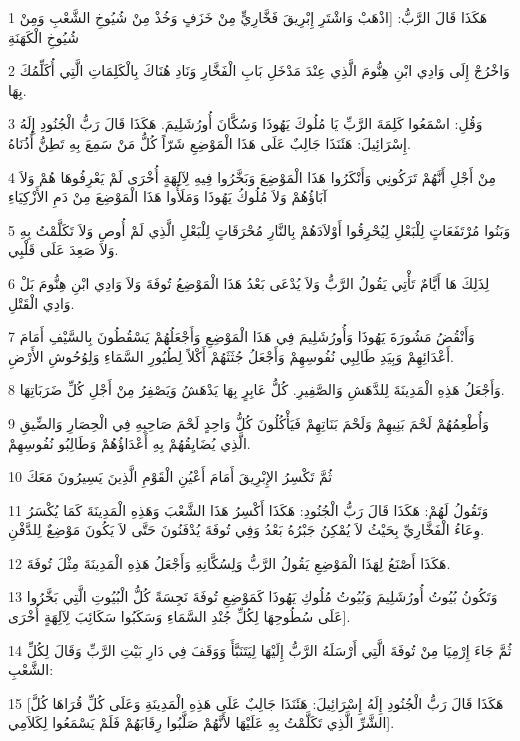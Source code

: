 \par 1 هَكَذَا قَالَ الرَّبُّ: [اذْهَبْ وَاشْتَرِ إِبْرِيقَ فَخَّارِيٍّ مِنْ خَزَفٍ وَخُذْ مِنْ شُيُوخِ الشَّعْبِ وَمِنْ شُيُوخِ الْكَهَنَةِ
\par 2 وَاخْرُجْ إِلَى وَادِي ابْنِ هِنُّومَ الَّذِي عِنْدَ مَدْخَلِ بَابِ الْفَخَّارِ وَنَادِ هُنَاكَ بِالْكَلِمَاتِ الَّتِي أُكَلِّمُكَ بِهَا.
\par 3 وَقُلِ: اسْمَعُوا كَلِمَةَ الرَّبِّ يَا مُلُوكَ يَهُوذَا وَسُكَّانَ أُورُشَلِيمَ. هَكَذَا قَالَ رَبُّ الْجُنُودِ إِلَهُ إِسْرَائِيلَ: هَئَنَذَا جَالِبٌ عَلَى هَذَا الْمَوْضِعِ شَرّاً كُلُّ مَنْ سَمِعَ بِهِ تَطِنُّ أُذُنَاهُ.
\par 4 مِنْ أَجْلِ أَنَّهُمْ تَرَكُونِي وَأَنْكَرُوا هَذَا الْمَوْضِعَ وَبَخَّرُوا فِيهِ لِآلِهَةٍ أُخْرَى لَمْ يَعْرِفُوهَا هُمْ وَلاَ آبَاؤُهُمْ وَلاَ مُلُوكُ يَهُوذَا وَمَلَأُوا هَذَا الْمَوْضِعَ مِنْ دَمِ الأَزْكِيَاءِ
\par 5 وَبَنُوا مُرْتَفَعَاتٍ لِلْبَعْلِ لِيُحْرِقُوا أَوْلاَدَهُمْ بِالنَّارِ مُحْرَقَاتٍ لِلْبَعْلِ الَّذِي لَمْ أُوصِ وَلاَ تَكَلَّمْتُ بِهِ وَلاَ صَعِدَ عَلَى قَلْبِي.
\par 6 لِذَلِكَ هَا أَيَّامٌ تَأْتِي يَقُولُ الرَّبُّ وَلاَ يُدْعَى بَعْدُ هَذَا الْمَوْضِعُ تُوفَةَ وَلاَ وَادِي ابْنِ هِنُّومَ بَلْ وَادِي الْقَتْلِ.
\par 7 وَأَنْقُضُ مَشُورَةَ يَهُوذَا وَأُورُشَلِيمَ فِي هَذَا الْمَوْضِعِ وَأَجْعَلُهُمْ يَسْقُطُونَ بِالسَّيْفِ أَمَامَ أَعْدَائِهِمْ وَبِيَدِ طَالِبِي نُفُوسِهِمْ وَأَجْعَلُ جُثَثَهُمْ أَكْلاً لِطُيُورِ السَّمَاءِ وَلِوُحُوشِ الأَرْضِ.
\par 8 وَأَجْعَلُ هَذِهِ الْمَدِينَةَ لِلدَّهَشِ وَالصَّفِيرِ. كُلُّ عَابِرٍ بِهَا يَدْهَشُ وَيَصْفِرُ مِنْ أَجْلِ كُلِّ ضَرَبَاتِهَا.
\par 9 وَأُطْعِمُهُمْ لَحْمَ بَنِيهِمْ وَلَحْمَ بَنَاتِهِمْ فَيَأْكُلُونَ كُلُّ وَاحِدٍ لَحْمَ صَاحِبِهِ فِي الْحِصَارِ وَالضِّيقِ الَّذِي يُضَايِقُهُمْ بِهِ أَعْدَاؤُهُمْ وَطَالِبُو نُفُوسِهِمْ.
\par 10 ثُمَّ تَكْسِرُ الإِبْرِيقَ أَمَامَ أَعْيُنِ الْقَوْمِ الَّذِينَ يَسِيرُونَ مَعَكَ
\par 11 وَتَقُولُ لَهُمْ: هَكَذَا قَالَ رَبُّ الْجُنُودِ: هَكَذَا أَكْسِرُ هَذَا الشَّعْبَ وَهَذِهِ الْمَدِينَةَ كَمَا يُكْسَرُ وِعَاءُ الْفَخَّارِيِّ بِحَيْثُ لاَ يُمْكِنُ جَبْرُهُ بَعْدُ وَفِي تُوفَةَ يُدْفَنُونَ حَتَّى لاَ يَكُونَ مَوْضِعٌ لِلدَّفْنِ.
\par 12 هَكَذَا أَصْنَعُ لِهَذَا الْمَوْضِعِ يَقُولُ الرَّبُّ وَلِسُكَّانِهِ وَأَجْعَلُ هَذِهِ الْمَدِينَةَ مِثْلَ تُوفَةَ.
\par 13 وَتَكُونُ بُيُوتُ أُورُشَلِيمَ وَبُيُوتُ مُلُوكِ يَهُوذَا كَمَوْضِعِ تُوفَةَ نَجِسَةً كُلُّ الْبُيُوتِ الَّتِي بَخَّرُوا عَلَى سُطُوحِهَا لِكُلِّ جُنْدِ السَّمَاءِ وَسَكَبُوا سَكَائِبَ لِآلِهَةٍ أُخْرَى].
\par 14 ثُمَّ جَاءَ إِرْمِيَا مِنْ تُوفَةَ الَّتِي أَرْسَلَهُ الرَّبُّ إِلَيْهَا لِيَتَنَبَّأَ وَوَقَفَ فِي دَارِ بَيْتِ الرَّبِّ وَقَالَ لِكُلِّ الشَّعْبِ:
\par 15 [هَكَذَا قَالَ رَبُّ الْجُنُودِ إِلَهُ إِسْرَائِيلَ: هَئَنَذَا جَالِبٌ عَلَى هَذِهِ الْمَدِينَةِ وَعَلَى كُلِّ قُرَاهَا كُلَّ الشَّرِّ الَّذِي تَكَلَّمْتُ بِهِ عَلَيْهَا لأَنَّهُمْ صَلَّبُوا رِقَابَهُمْ فَلَمْ يَسْمَعُوا لِكَلاَمِي].

